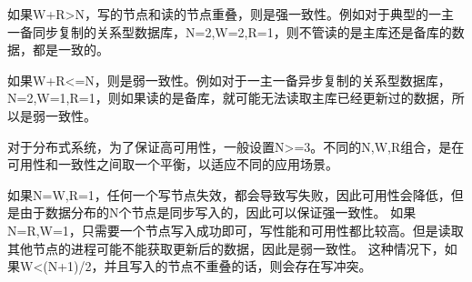 如果W+R>N，写的节点和读的节点重叠，则是强一致性。例如对于典型的一主一备同步复制的关系型数据库，N=2,W=2,R=1，则不管读的是主库还是备库的数据，都是一致的。

如果W+R<=N，则是弱一致性。例如对于一主一备异步复制的关系型数据库，N=2,W=1,R=1，则如果读的是备库，就可能无法读取主库已经更新过的数据，所以是弱一致性。

对于分布式系统，为了保证高可用性，一般设置N>=3。不同的N,W,R组合，是在可用性和一致性之间取一个平衡，以适应不同的应用场景。

如果N=W,R=1，任何一个写节点失效，都会导致写失败，因此可用性会降低，但是由于数据分布的N个节点是同步写入的，因此可以保证强一致性。 
如果N=R,W=1，只需要一个节点写入成功即可，写性能和可用性都比较高。但是读取其他节点的进程可能不能获取更新后的数据，因此是弱一致性。
这种情况下，如果W<(N+1)/2，并且写入的节点不重叠的话，则会存在写冲突。




